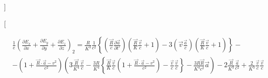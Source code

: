 \documentclass[11pt]{article}
\begin{document}
{]}

{[}

\begin{align}
  & \frac{1}{e}{{\left( \frac{\partial {{E}_{x}}}{\partial x}+\frac{\partial {{E}_{y}}}{\partial y}+\frac{\partial {{E}_{z}}}{\partial z} \right)}_{2}}=\frac{R}{{{K}^{3}}}\frac{1}{{{c}^{2}}}\left\{ \left( \frac{\overrightarrow{R}}{c}\frac{\partial \overrightarrow{a}}{\partial t'} \right)\left( \frac{\overrightarrow{R}}{K}\frac{\overrightarrow{v}}{c}+1 \right)-3\left( \overrightarrow{v}\frac{\overrightarrow{a}}{c} \right)\left( \frac{\overrightarrow{R}}{K}\frac{\overrightarrow{v}}{c}+1 \right) \right\}- \\ 
 & -\left( 1+\frac{\overrightarrow{R}\cdot \overrightarrow{a}-{{v}^{2}}}{{{c}^{2}}} \right)\left( 3\frac{\overrightarrow{R}}{{{K}^{4}}}\frac{\overrightarrow{v}}{c}-\frac{3R}{{{K}^{4}}}\left\{ \frac{\overrightarrow{R}}{K}\frac{\overrightarrow{v}}{c}\left( 1+\frac{\overrightarrow{R}\cdot \overrightarrow{a}-{{v}^{2}}}{{{c}^{2}}} \right)-\frac{\overrightarrow{v}}{c}\frac{\overrightarrow{v}}{c} \right\}-\frac{3R\overrightarrow{R}}{{{K}^{4}}{{c}^{2}}}\overrightarrow{a} \right)-2\frac{\overrightarrow{R}}{{{K}^{3}}}\frac{\overrightarrow{a}}{{{c}^{2}}}+\frac{2}{{{K}^{3}}}\frac{\overrightarrow{v}}{c}\frac{\overrightarrow{v}}{c} \\ 
\end{align}
\end{document}
